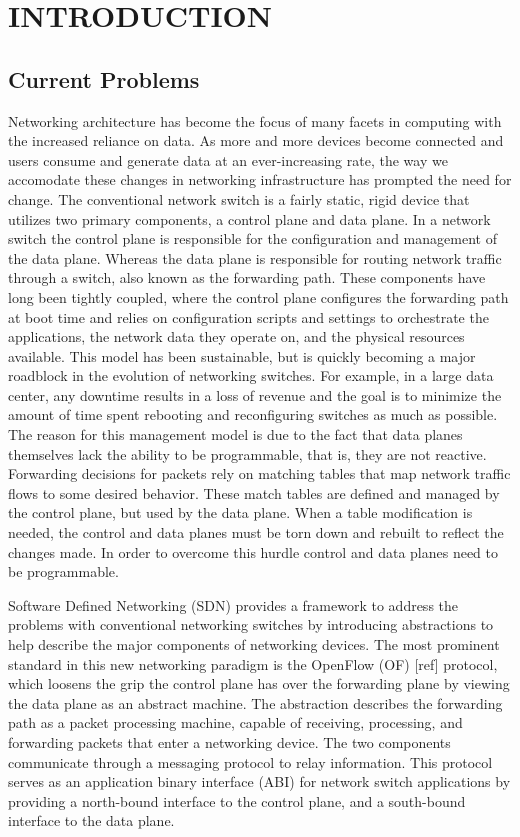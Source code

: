\chapter{INTRODUCTION}
\label{intro}

\section{Current Problems}

Networking architecture has become the focus of many facets in computing
with the increased reliance on data. As more and more devices become connected
and users consume and generate data at an ever-increasing rate, the way we
accomodate these changes in networking infrastructure has prompted the need
for change. The conventional network switch is a fairly static, rigid device
that utilizes two primary components, a control plane and data plane. In a
network switch the control plane is responsible for the configuration and
management of the data plane. Whereas the data plane is responsible for routing
network traffic through a switch, also known as the forwarding path. These
components have long been tightly coupled, where the control plane configures 
the forwarding path at boot time and relies on configuration scripts and
settings to orchestrate the applications, the network data they operate on, 
and the physical resources available. This model has been sustainable, but is 
quickly becoming a major roadblock in the evolution of networking switches. 
For example, in a large data center, any downtime results in a loss of revenue 
and the goal is to minimize the amount of time spent rebooting and
reconfiguring switches as much as possible. The reason for this management
model is due to the fact that data planes themselves lack the ability to be
programmable, that is, they are not reactive. Forwarding decisions for packets
rely on matching tables that map network traffic flows to some desired 
behavior. These match tables are defined and managed by the control plane, but
used by the data plane. When a table modification is needed, the control and
data planes must be torn down and rebuilt to reflect the changes made. In
order to overcome this hurdle control and data planes need to be programmable.

Software Defined Networking (SDN) provides a framework to address the
problems with conventional networking switches by introducing abstractions
to help describe the major components of networking devices. The most prominent
standard in this new networking paradigm is the OpenFlow (OF) [ref] protocol,
which loosens the grip the control plane has over the forwarding plane by 
viewing the data plane as an abstract machine. The abstraction describes the 
forwarding path as a packet processing machine, capable of receiving,
processing, and forwarding packets that enter a networking device. The two 
components communicate through a messaging protocol to relay information. This
protocol serves as an application binary interface (ABI) for network switch 
applications by providing a north-bound interface to the control plane, and a 
south-bound interface to the data plane.


